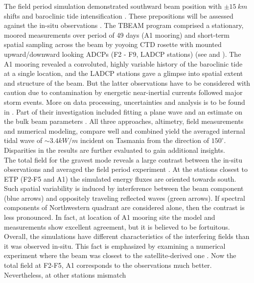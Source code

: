 \documentclass[12pt]{article}
\begin{document}
The field period simulation demonstrated southward beam position with $\pm 15~km$ shifts 
and baroclinic tide intensification . These prepositions will be 
assessed against the in-situ observations \citep{waterhouse2018observations}. The TBEAM program 
comprised a stationary, moored measurements over period of 49 days (A1 mooring) 
and short-term spatial sampling across the beam by yoyoing CTD rosette with mounted upward/downward 
looking ADCPs (F2 - F9, LADCP stations)  (see  and 
). The 
A1 mooring revealed a convoluted, highly variable history of the baroclinic tide at a single 
location, and the LADCP stations gave a glimpse into spatial extent and structure of the beam. 
But the latter observations have to be considered with caution due to contamination by 
energetic near-inertial currents followed major storm events. More on data processing, 
uncertainties and analysis is to be found in \citep{waterhouse2018observations}. Part of their   
investigation included fitting a plane wave and an estimate on the bulk beam parameters 
. All three approaches, altimetry, field measurements and numerical modeling, 
compare well and combined yield the averaged internal tidal wave of $\sim 3.4 kW/m$ incident on 
Tasmania from the direction of $150^{\circ}$. Disparities in the results are further evaluated to 
gain additional insights.\\
The total field for the gravest mode  reveals a large contrast 
between the in-situ observations and averaged the field period experiment 
. At the stations closest to ETP (F2-F5 and 
A1) the simulated energy fluxes are oriented towards south. Such spatial variability is induced by 
interference between the beam component (blue arrows) and oppositely traveling reflected waves 
(green arrows). If spectral components of Northwestern quadrant  are considered alone, then 
the contrast is less pronounced. In fact, at location 
of A1 mooring site the model and measurements show excellent agreement, but it is believed to be fortuitous. Overall, the simulations have different characteristics of the interfering fields than it was 
observed in-situ. This fact is emphasized by examining a numerical experiment where the beam was 
closest to the satellite-derived one . Now the total field at 
F2-F5, A1 corresponds to the observations much better. Nevertheless, at other stations mismatch 
\end{document}
